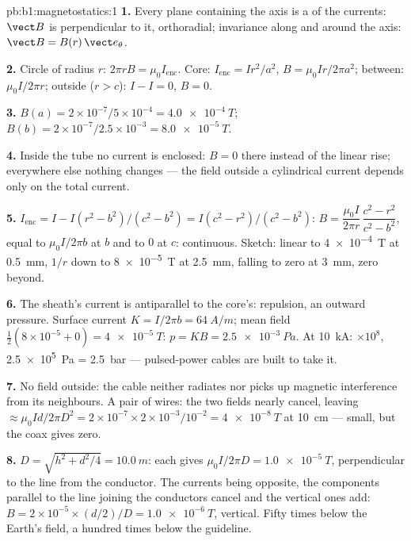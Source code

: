 \begin{solution}{pb:b1:magnetostatics:1}
\textbf{1.} Every plane containing the axis is a  of
the currents: $\vect B$ is perpendicular to it, orthoradial; invariance
along and around the axis: $\vect B = B(r)\,\vect e_\theta$.

\textbf{2.} Circle of radius $r$: $2\pi rB = \mu_0I_{\text{enc}}$. Core:
$I_{\text{enc}} = Ir^2/a^2$, $B = \mu_0Ir/2\pi a^2$; between: $\mu_0I/2\pi r$;
outside ($r > c$): $I - I = 0$, $B = 0$.

\textbf{3.} $B(a) = 2 \times 10^{-7}/5 \times 10^{-4} = \qty{4.0e-4}{T}$; $B(b) = 2 \times
10^{-7}/2.5 \times 10^{-3} = \qty{8.0e-5}{T}$.

\textbf{4.} Inside the tube no current is enclosed: $B = 0$ there instead
of the linear rise; everywhere else nothing changes --- the field outside
a cylindrical current depends only on the total current.

\textbf{5.} $I_{\text{enc}} = I - I(r^2 - b^2)/(c^2 - b^2) = I(c^2 - r^2)/(c^2 -
b^2)$: $B = \dfrac{\mu_0I}{2\pi r}\,\dfrac{c^2 - r^2}{c^2 - b^2}$, equal to $\mu_0I/2\pi b$ at
$b$ and to $0$ at $c$: continuous. Sketch: linear to \qty{4e-4}{T} at
\qty{0.5}{mm}, $1/r$ down to \qty{8e-5}{T} at \qty{2.5}{mm}, falling to zero at
\qty{3}{mm}, zero beyond.

\textbf{6.} The sheath's current is antiparallel to the core's: repulsion,
an outward pressure. Surface current $K = I/2\pi b = \qty{64}{A/m}$; mean field
$\tfrac12(8 \times 10^{-5} + 0) = \qty{4e-5}{T}$: $p = KB = \qty{2.5e-3}{Pa}$. At
\qty{10}{kA}: $\times10^8$, \qty{2.5e5}{Pa} = \qty{2.5}{bar} --- pulsed-power
cables are built to take it.

\textbf{7.} No field outside: the cable neither radiates nor picks up
magnetic interference from its neighbours. A pair of wires: the two
fields nearly cancel, leaving $\approx \mu_0Id/2\pi D^2 = 2 \times 10^{-7} \times 2 \times
10^{-3}/10^{-2} = \qty{4e-8}{T}$ at \qty{10}{cm} --- small, but the coax gives
zero.

\textbf{8.} $D = \sqrt{h^2 + d^2/4} = \qty{10.0}{m}$: each gives $\mu_0I/2\pi D =
\qty{1.0e-5}{T}$, perpendicular to the line from the conductor. The
currents being opposite, the components parallel to the line joining
the conductors cancel and the vertical ones add: $B = 2 \times 10^{-5} \times
(d/2)/D = \qty{1.0e-6}{T}$, vertical. Fifty times below the Earth's field,
a hundred times below the guideline.


\end{solution}
